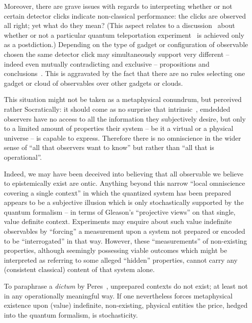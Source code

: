 Moreover, there are grave issues with regards to interpreting whether or not certain detector clicks
indicate non-classical performance:
the clicks are observed all right; yet what do they mean?
(This aspect relates to a discussion~\cite{Kimble-aposterioriQT,Bouwm-aposterioriQTReply}
about whether or not a particular
quantum teleportation experiment~\cite{Bouwmeester1997} is achieved only as a postdiction.)
Depending on the type of gadget or configuration of observable chosen
the same detector click may simultaneously support very different
-- indeed even mutually contradicting and exclusive --
propositions and conclusions~\cite{svozil-2018-whycontexts,svozil-2018-c}.
This is aggravated by the fact that there are no rules selecting one gadget or cloud of observables over other gadgets or clouds.


This situation might not be taken as a metaphysical conundrum, but perceived rather Socratically:
it should come as no surprise that intrinsic~\cite{svozil-94}, emdedded~\cite{toffoli:79}
observers have no access to
all the information they subjectively desire, but only to a limited amount of properties
their system -- be it a virtual or a physical universe -- is capable to express.
Therefore there is no omniscience in the wider sense of ``all that observers want to know''
but rather than ``all that is operational''.

Indeed, we may have been deceived into believing that all observable we believe to epistemically exist
are ontic.
Anything beyond this narrow ``local omniscience covering a single context''
in which the quantized system has been prepared
appears to be a subjective illusion which is only stochastically  supported by the quantum formalism --
in terms of Gleason's ``projective views'' on that single, value definite context.
Experiments may enquire about such value indefinite observables by ``forcing'' a measurement upon
a system not prepared or encoded to be ``interrogated'' in that way.
However,  these ``measurements'' of non-existing properties,
although seemingly possessing viable outcomes
which might be interpreted as referring to some alleged ``hidden'' properties,
cannot carry any (consistent classical) content of that system alone.

To paraphrase a {\it dictum} by Peres~\cite{peres222}, unprepared contexts do not exist;
at least not in any operationally meaningful way.
If one nevertheless forces metaphysical existence upon (value) indefinite, non-existing, physical entities
the price, hedged into the quantum formalism, is stochasticity.







